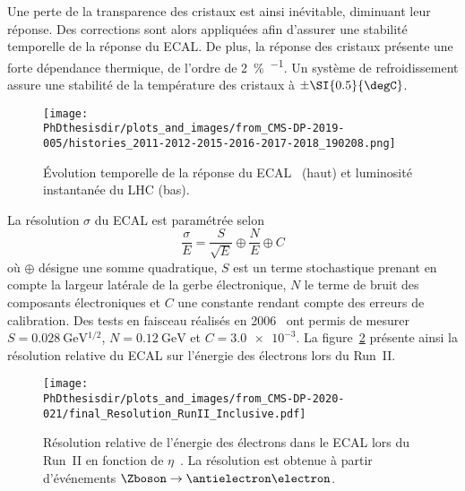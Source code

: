 Une perte de la transparence des cristaux est ainsi inévitable, diminuant leur réponse.
Des corrections sont alors appliquées afin d'assurer une stabilité temporelle de la réponse du ECAL.
De plus, la réponse des cristaux présente une forte dépendance thermique, de l'ordre de \SI{2}{\%.\degC^{-1}}.
Un système de refroidissement assure une stabilité de la température des cristaux à $\pm\SI{0.5}{\degC}$.
\begin{figure}[h]
\centering
\texttt{[image: \\PhDthesisdir/plots\_and\_images/from\_CMS-DP-2019-005/histories\_2011-2012-2015-2016-2017-2018\_190208.png]}
\caption[Évolution temporelle de la réponse du ECAL.]{Évolution temporelle de la réponse du ECAL~\cite{CMS-DP-2019-005} (haut) et luminosité instantanée du LHC (bas).}
\label{fig-chapter-LHC-section-CMS-subsec-ECAL-CMS-DP-2019-005-histories_2011-2012-2015-2016-2017-2018_190208}
\end{figure}
\par La résolution $\sigma$ du ECAL est paramétrée selon
\begin{equation}
\frac{\sigma}{E}
=
\frac{S}{\sqrt{E}}
\oplus
\frac{N}{E}
\oplus
C
\end{equation}
où $\oplus$ désigne une somme quadratique,
$S$ est un terme stochastique prenant en compte la largeur latérale de la gerbe électronique,
$N$ le terme de bruit des composants électroniques et
$C$ une constante rendant compte des erreurs de calibration.
Des tests en faisceau réalisés en 2006~\cite{cms_paper} ont permis de mesurer
$S = \SI{0.028}{\GeV^{1/2}}$,
$N = \SI{0.12}{\GeV}$ et
$C = \num{3.0e-3}$.
La figure~\ref{fig-chapter-LHC-section-CMS-subsec-ECAL-CMS-DP-2020-021-final_Resolution_RunII_Inclusive} présente ainsi la résolution relative du ECAL sur l'énergie des électrons lors du Run~II.
\begin{figure}[h]
\centering
\texttt{[image: \\PhDthesisdir/plots\_and\_images/from\_CMS-DP-2020-021/final\_Resolution\_RunII\_Inclusive.pdf]}
\caption[Résolution relative de l'énergie des électrons dans le ECAL lors du Run~II.]{Résolution relative de l'énergie des électrons dans le ECAL lors du Run~II en fonction de $\eta$~\cite{CMS-DP-2020-021}. La résolution est obtenue à partir d'événements $\Zboson\to\antielectron\electron$.}
\label{fig-chapter-LHC-section-CMS-subsec-ECAL-CMS-DP-2020-021-final_Resolution_RunII_Inclusive}
\end{figure}
